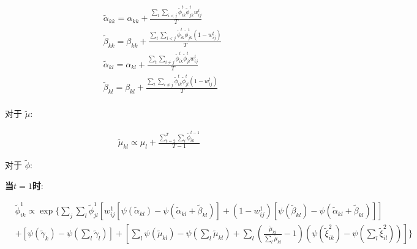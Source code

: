 \begin{equation}
\label{eq6}
\begin{split}
& \widetilde{\alpha}_{kk} = \alpha_{kk} + \frac{\sum_t \sum_{i<j} \widetilde{\phi}_{ik}^t \widetilde{\phi}_{jk}^t w_{ij}^t}{T}  \\
& \widetilde{\beta}_{kk} = \beta_{kk} + \frac{\sum_t \sum_{i<j} \widetilde{\phi}_{ik}^t \widetilde{\phi}_{jk}^t (1-w_{ij}^t)}{T} \\
& \widetilde{\alpha}_{kl} = \alpha_{kl} + \frac{\sum_t \sum_{i \neq j} \widetilde{\phi}_{ik}^t \widetilde{\phi}_{jl}^t w_{ij}^t}{T} \\
& \widetilde{\beta}_{kl} = \beta_{kl} + \frac{\sum_t \sum_{i \neq j} \widetilde{\phi}_{ik}^t \widetilde{\phi}_{jl}^t (1-w_{ij}^t)}{T}  \\
\end{split}
\end{equation}

对于\textbf{ $\widetilde{\mu}$}:

\begin{equation}
\label{eq7}
\begin{split}
\widetilde{\mu}_{kl} \propto \mu_l + \frac{\sum_{t=2}^T \sum_i \widetilde{\phi}_{ik}^{t-1}}{T-1}
\end{split}
\end{equation}

对于 \textbf{$\widetilde{\phi}$}:

\textbf{当$t=1$时}:

\begin{equation}
\label{eq8}
\begin{split}
&\widetilde{\phi}_{ik}^1 \propto \exp\{\sum_j \sum_l \widetilde{\phi}_{jl}^1 [w_{ij}^1[\psi(\widetilde{\alpha}_{kl})-\psi(\widetilde{\alpha}_{kl}+\widetilde{\beta}_{kl})]
  + (1-w_{ij}^1)[\psi(\widetilde{\beta}_{kl}) - \psi(\widetilde{\alpha}_{kl}+\widetilde{\beta}_{kl})] ]   \\
& +[\psi(\widetilde{\gamma}_k)-\psi(\sum_l \widetilde{\gamma}_l) ] +[\sum_l \psi(\widetilde{\mu}_{kl}) - \psi(\sum_l \widetilde{\mu}_{kl}) 
+ \sum_l (\frac{\widetilde{\mu}_{kl}}{\sum_l \widetilde{\mu}_{kl}}-1)(\psi (\widetilde{\xi}_{ik}^2) - \psi(\sum_l \widetilde{\xi}_{il}^2))]  \} \\
\end{split}
\end{equation}

